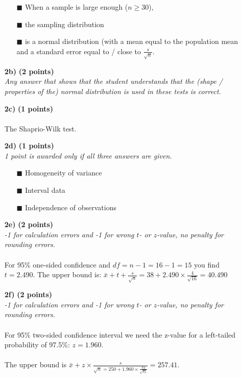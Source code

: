 \begin{itemize}
    \begin{itemize}
        \item[$\blacksquare$] When a sample is large enough ($n \geq 30$),        
        \item[$\blacksquare$] the sampling distribution
        \item[$\blacksquare$] is a normal distribution (with a mean equal to the population mean and a standard error equal to / close to $\frac{s}{\sqrt{n}}$.
    \end{itemize}
\item[\textbf{2b)}] \textbf{(2 points)} \\
     \textit{Any answer that shows that the student understands that the (shape / properties of the) normal distribution is used in these tests is correct.}
\item[\textbf{2c)}] \textbf{(1 points)} \\ \\
     The Shaprio-Wilk test. \\
\item[\textbf{2d)}] \textbf{(1 points)} \\
     \textit{1 point is awarded only if all three answers are given.} \\
    \begin{itemize}
        \item[$\blacksquare$] Homogeneity of variance
        \item[$\blacksquare$] Interval data
        \item[$\blacksquare$] Independence of observations
    \end{itemize}
\item[\textbf{2e)}] \textbf{(2 points)} \\
     \textit{-1 for calculation errors and -1 for wrong $t$- or $z$-value, no penalty for rounding errors.} \\ 
     \\
     For 95\% one-sided confidence and $df = n - 1 = 16 - 1 = 15$ you find $t = 2.490$. The upper bound is: $\bar{x} + t + \frac{s}{\sqrt{n}} = 38 + 2.490 \times \frac{4}{\sqrt{16}} = 40.490$ \\
\item[\textbf{2f)}] \textbf{(2 points)} \\
     \textit{-1 for calculation errors and -1 for wrong $t$- or $z$-value, no penalty for rounding errors.} \\ 
     \\
     For 95\% two-sided confidence interval we need the z-value for a left-tailed probability of 97.5\%: $z = 1.960$. \\ \\The upper bound is $\bar{x} + z \times \frac{s}{\sqrt{n} = 250 + 1.960 \times \frac{34}{\sqrt{81}}} = 257.41$. \\ \\

\end{itemize}
